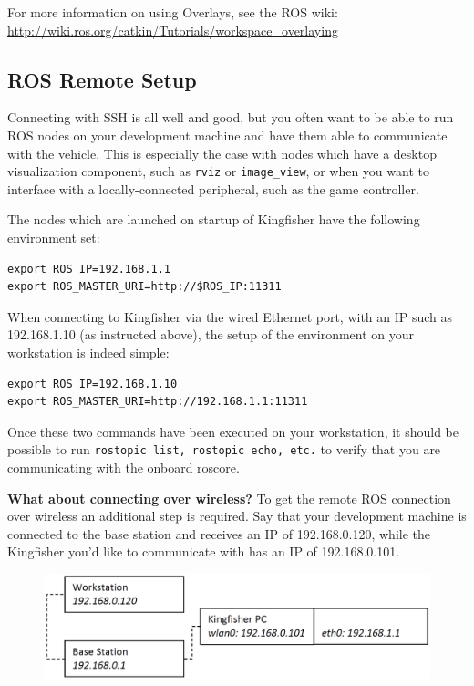 \documentclass[]{clearpath-latex/clearpath-manual}
\begin{document}
For more information on using Overlays, see the ROS wiki: \url{http://wiki.ros.org/catkin/Tutorials/workspace_overlaying}

\subsection{ROS Remote Setup}
Connecting with SSH is all well and good, but you often want to be able to run ROS nodes on your development machine and have them able to communicate with the vehicle. This is especially the case with nodes which have a desktop visualization component, such as \lstinline{rviz} or \lstinline{image_view}, or when you want to interface with a locally-connected peripheral, such as the game controller.

The nodes which are launched on startup of Kingfisher have the following environment set:

\begin{lstlisting}
export ROS_IP=192.168.1.1 
export ROS_MASTER_URI=http://$ROS_IP:11311
\end{lstlisting}

When connecting to Kingfisher via the wired Ethernet port, with an IP such as 192.168.1.10 (as instructed above), the setup of the environment on your workstation is indeed simple:

\begin{lstlisting}
export ROS_IP=192.168.1.10 
export ROS_MASTER_URI=http://192.168.1.1:11311
\end{lstlisting}

Once these two commands have been executed on your workstation, it should be possible to run \lstinline{rostopic list, rostopic echo, etc.} to verify that you are communicating with the onboard roscore.

\textbf{What about connecting over wireless?} To get the remote ROS connection over wireless an additional step is required. Say that your development machine is connected to the base station and receives an IP of 192.168.0.120, while the Kingfisher you’d like to communicate with has an IP of 192.168.0.101.

\begin{figure}[h]
  \centering
  \includegraphics[width=0.75\linewidth]{kf_wireless.PNG}
  \label{kf_wireless}
\end{figure}
\end{document}
